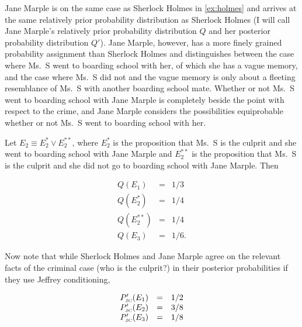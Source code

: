 \documentclass[smallextended]{svjour3}       %
\begin{document}
\begin{quotex}
  \label{ex:marple} Jane Marple is on the same
  case as Sherlock Holmes in {\xample} \ref{ex:holmes} and arrives at
  the same relatively prior probability distribution as Sherlock
  Holmes (I will call Jane Marple's relatively prior probability
  distribution $Q$ and her posterior probability distribution $Q'$).
  Jane Marple, however, has a more finely grained probability
  assignment than Sherlock Holmes and distinguishes between the case
  where Ms.\ S went to boarding school with her, of which she has a
  vague memory, and the case where Ms.\ S did not and the vague memory
  is only about a fleeting resemblance of Ms.\ S with another boarding
  school mate. Whether or not Ms.\ S went to boarding school with Jane
  Marple is completely beside the point with respect to the crime, and
  Jane Marple considers the possibilities equiprobable whether or not
  Ms.\ S went to boarding school with her.
\end{quotex}

Let $E_{2}\equiv{}E_{2}^{*}\vee{}E_{2}^{**}$, where $E_{2}^{*}$ is the
proposition that Ms.\ S is the culprit and she went to boarding school
with Jane Marple and $E_{2}^{**}$ is the proposition that Ms.\ S is
the culprit and she did not go to boarding school with Jane Marple.
Then

\begin{equation}
  \label{eq:marpleprior}
  \begin{array}{rcl}
  Q(E_{1})&=&1/3\\
  Q(E_{2}^{*})&=&1/4\\
  Q(E_{2}^{**})&=&1/4\\
  Q(E_{3})&=&1/6.
\end{array}
\end{equation}

Now note that while Sherlock Holmes and Jane Marple agree on the
relevant facts of the criminal case (who is the culprit?) in their
posterior probabilities if they use Jeffrey conditioning,

\begin{equation}
  \label{eq:sherlockposteriorjc}
  \begin{array}{rcl}
  P'_{\mbox{\tiny JC}}(E_{1})&=&1/2\\
  P'_{\mbox{\tiny JC}}(E_{2})&=&3/8\\
  P'_{\mbox{\tiny JC}}(E_{3})&=&1/8
\end{array}
\end{equation}
\end{document}
